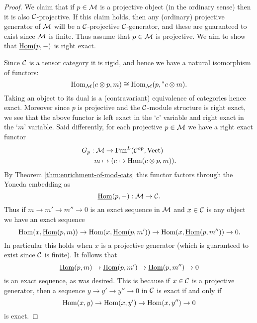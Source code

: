 \documentclass{amsart}
\begin{document}
\begin{proof}
	We claim that if $p \in \mathcal M$ is a projective object (in the ordinary sense) then it is also $\mathcal C$-projective. If this claim holds, then any (ordinary) projective generator of $\mathcal M$ will be a $\mathcal C$-projective $\mathcal C$-generator, and these are guaranteed to exist since $\mathcal M$ is finite. Thus assume that $p \in \mathcal M$ is projective.  We aim to show that $\operatorname{\underline{Hom}}(p, -)$ is right exact. 
	
	Since $\mathcal C$ is a tensor category it is rigid, and hence we have a natural isomorphism of functors:
\begin{equation*}
	\operatorname{Hom}_{\mathcal M}(c \otimes p, m) \cong \operatorname{Hom}_{\mathcal M}(p, {}^*c \otimes m).
\end{equation*}
Taking an object to its dual is a (contravariant) equivalence of categories hence exact. Moreover since $p$ is projective and the $\mathcal C$-module structure is right exact, we see that the above functor is left exact in the `$c$' variable and right exact in the `$m$' variable. Said differently, for each projective $p \in \mathcal M$ we have a right exact functor
\begin{align*}
	G_p: & \; \mathcal M \to \operatorname{Fun}^L(\mathcal C^{\mathrm{op}}, \mathrm{Vect}) \\
	& m \mapsto (c \mapsto \operatorname{Hom}(c \otimes p, m)).
\end{align*}
By Theorem \ref{thm:enrichment-of-mod-cats} this functor factors through the Yoneda embedding as
\begin{equation*}
	\operatorname{\underline{Hom}}(p, -): \mathcal M \to \mathcal C.
\end{equation*}
Thus if $m \to m' \to m'' \to 0$ is an exact sequence in $\mathcal M$ and $x \in \mathcal C$ is any object we have an exact sequence
\begin{equation*}
	\operatorname{Hom}(x, \operatorname{\underline{Hom}}(p,m)) \to \operatorname{Hom}(x, \operatorname{\underline{Hom}}(p,m')) \to \operatorname{Hom}(x, \operatorname{\underline{Hom}}(p,m'')) \to 0.
\end{equation*}
In particular this holds when $x$ is a projective generator (which is guaranteed to exist since $\mathcal C$ is finite). It follows that 
\begin{equation*}
	\operatorname{\underline{Hom}}(p,m) \to \operatorname{\underline{Hom}}(p,m') \to \operatorname{\underline{Hom}}(p,m'') \to 0
\end{equation*}
is an exact sequence, as was desired. This is because if $x \in \mathcal C$ is a projective generator, then a sequence $y \to y' \to y'' \to 0$ in $\mathcal C$ is exact if and only if 
\begin{equation*}
	\operatorname{Hom}(x, y) \to \operatorname{Hom}(x, y') \to \operatorname{Hom}(x, y'') \to 0
\end{equation*} 
is exact. 
\end{proof}
\end{document}
